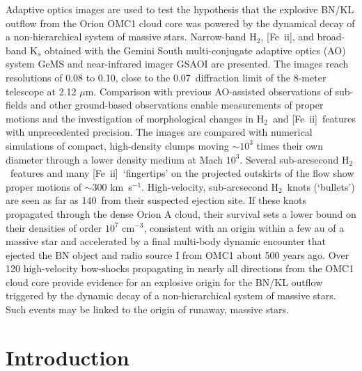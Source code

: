 \documentclass{aa}
\newcommand{\cmq}{cm{$^{-3}$}}
\newcommand{\kms}{km~s{$^{-1}$}}
\newcommand{\Feii}{[Fe~{\sc ii}]}
\newcommand{\mum}{\ensuremath{\mu \mathrm{m}}}
\newcommand{\hh}{\ensuremath{\textrm{H}_{2}}}			%
\begin{document}
\abstract
{}
{Adaptive optics images are used to test the hypothesis
that the explosive  BN/KL outflow from the Orion OMC1 cloud 
core was powered by the dynamical decay of a non-hierarchical
system of massive stars.  }
{
Narrow-band \hh ,  \Feii, and broad-band K$_s$ obtained with the Gemini 
South multi-conjugate adaptive optics (AO) system GeMS and near-infrared 
imager GSAOI are presented.    The images reach resolutions of  0.08 to 
0.10\arcsec, close to the 0.07\arcsec\ diffraction limit of the 8-meter 
telescope at 2.12 \mum.  Comparison with previous AO-assisted observations of 
sub-fields and other ground-based observations enable measurements of proper 
motions and the investigation of morphological changes in  \hh\ and \Feii\ features 
with  unprecedented precision.   The images are compared with numerical simulations of 
compact, high-density clumps moving $\sim 10^3$ times their own
diameter through a lower density medium at Mach $10^3$. 
}
{
Several sub-arcsecond \hh\ features and many \Feii\ `fingertips' on the 
projected outskirts of the flow show 
proper motions of $\sim$300 \kms.    High-velocity,  
sub-arcsecond   \hh\  knots (`bullets')  
are seen as far as 140\arcsec\ from their suspected ejection site.    
If these knots propagated through the dense  Orion A 
cloud, their survival  sets  a lower bound on their densities of order $10^7$ \cmq ,  
consistent with an origin within a few au of a massive star and accelerated
by a final multi-body dynamic encounter  that ejected  
the BN  object and radio source I from OMC1 about 500 years ago.  
}
{
Over 120 high-velocity bow-shocks propagating in nearly all 
directions from the OMC1 cloud core provide evidence for an explosive 
origin for the BN/KL outflow triggered by the dynamic decay of a non-hierarchical
system of massive stars.   Such events may be linked to the origin of 
runaway, massive stars. 
}

\maketitle

\section{Introduction} 
\end{document}
